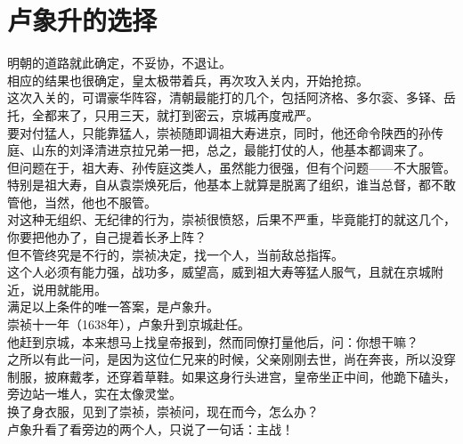 \section{卢象升的选择}
\ifnum{}
	\begin{multicols}{\theparacolNo}
\fi
明朝的道路就此确定，不妥协，不退让。\\

相应的结果也很确定，皇太极带着兵，再次攻入关内，开始抢掠。\\

这次入关的，可谓豪华阵容，清朝最能打的几个，包括阿济格、多尔衮、多铎、岳托，全都来了，只用三天，就打到密云，京城再度戒严。\\

要对付猛人，只能靠猛人，崇祯随即调祖大寿进京，同时，他还命令陕西的孙传庭、山东的刘泽清进京拉兄弟一把，总之，最能打仗的人，他基本都调来了。\\

但问题在于，祖大寿、孙传庭这类人，虽然能力很强，但有个问题——不大服管。特别是祖大寿，自从袁崇焕死后，他基本上就算是脱离了组织，谁当总督，都不敢管他，当然，他也不服管。\\

对这种无组织、无纪律的行为，崇祯很愤怒，后果不严重，毕竟能打的就这几个，你要把他办了，自己提着长矛上阵？\\

但不管终究是不行的，崇祯决定，找一个人，当前敌总指挥。\\

这个人必须有能力强，战功多，威望高，威到祖大寿等猛人服气，且就在京城附近，说用就能用。\\

满足以上条件的唯一答案，是卢象升。\\

崇祯十一年（1638年），卢象升到京城赴任。\\

他赶到京城，本来想马上找皇帝报到，然而同僚打量他后，问：你想干嘛？\\

之所以有此一问，是因为这位仁兄来的时候，父亲刚刚去世，尚在奔丧，所以没穿制服，披麻戴孝，还穿着草鞋。如果这身行头进宫，皇帝坐正中间，他跪下磕头，旁边站一堆人，实在太像灵堂。\\

换了身衣服，见到了崇祯，崇祯问，现在而今，怎么办？\\

卢象升看了看旁边的两个人，只说了一句话：主战！\\


\end{multicols}
